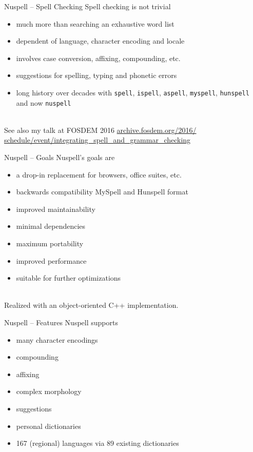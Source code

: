 \documentclass{beamer}
\begin{document}
\begin{frame}{Nuspell – Spell Checking}
Spell checking is \alert{not trivial}
\begin{itemize}
\item much more than searching an exhaustive word list
\item dependent of language, character encoding and locale
\item involves case conversion, affixing, compounding, etc.
\item suggestions for spelling, typing and phonetic errors
\item long history over decades with \texttt{spell}, \texttt{ispell}, \texttt{aspell}, \texttt{myspell}, \texttt{hunspell} and now \texttt{nuspell}
\end{itemize}
\mbox{}\\
See also my talk at FOSDEM 2016 \href{https://archive.fosdem.org/2016/schedule/event/integrating\_spell\_and\_grammar\_checking}{archive.fosdem.org/2016/\\schedule/event/integrating\_spell\_and\_grammar\_checking}
\end{frame}

\begin{frame}{Nuspell – Goals}
Nuspell's goals are
\begin{itemize}
\item a drop-in replacement for browsers, office suites, etc.
\item backwards compatibility MySpell and Hunspell format
\item improved maintainability
\item minimal dependencies
\item maximum portability
\item improved performance
\item suitable for further optimizations
\end{itemize}
\mbox{}\\
Realized with an object-oriented C++ implementation.
\end{frame}

\begin{frame}{Nuspell – Features}
Nuspell supports
\begin{itemize}
\item many character encodings
\item compounding
\item affixing
\item complex morphology
\item suggestions
\item personal dictionaries
\item 167 (regional) languages via 89 existing dictionaries
\end{itemize}
\end{frame}
\end{document}
